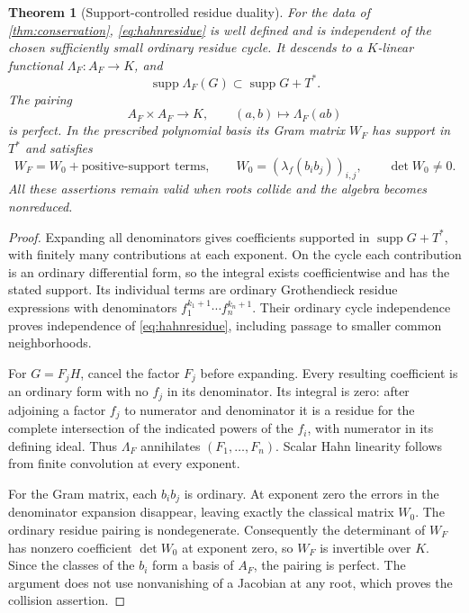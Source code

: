 \documentclass[11pt]{article}
\newtheorem{theorem}{Theorem}[section]
\theoremstyle{definition}
\newcommand{\supp}{\operatorname{supp}}
\begin{document}
\begin{theorem}[Support-controlled residue duality]\label{thm:residueduality}
For the data of \cref{thm:conservation}, \eqref{eq:hahnresidue} is well defined and is independent of the chosen sufficiently small ordinary residue cycle. It descends to a $K$-linear functional $\Lambda_F:A_F\to K$, and
\begin{equation}\label{eq:residuesupport}
 \supp\Lambda_F(G)\subset\supp G+T^*.
\end{equation}
The pairing
\begin{equation}\label{eq:pairing}
 A_F\times A_F\longrightarrow K,\qquad
 (a,b)\longmapsto\Lambda_F(ab)
\end{equation}
is perfect. In the prescribed polynomial basis its Gram matrix $W_F$ has support in $T^*$ and satisfies
\[
 W_F=W_0+\text{positive-support terms},\qquad
 W_0=(\lambda_f(b_ib_j))_{i,j},\qquad\det W_0\ne0.
\]
All these assertions remain valid when roots collide and the algebra becomes nonreduced.
\end{theorem}
\begin{proof}
Expanding all denominators gives coefficients supported in $\supp G+T^*$, with finitely many contributions at each exponent. On the cycle each contribution is an ordinary differential form, so the integral exists coefficientwise and has the stated support. Its individual terms are ordinary Grothendieck residue expressions with denominators $f_1^{k_1+1}\cdots f_n^{k_n+1}$. Their ordinary cycle independence proves independence of \eqref{eq:hahnresidue}, including passage to smaller common neighborhoods.

For $G=F_jH$, cancel the factor $F_j$ before expanding. Every resulting coefficient is an ordinary form with no $f_j$ in its denominator. Its integral is zero: after adjoining a factor $f_j$ to numerator and denominator it is a residue for the complete intersection of the indicated powers of the $f_i$, with numerator in its defining ideal. Thus $\Lambda_F$ annihilates $(F_1,\ldots,F_n)$. Scalar Hahn linearity follows from finite convolution at every exponent.

For the Gram matrix, each $b_ib_j$ is ordinary. At exponent zero the errors in the denominator expansion disappear, leaving exactly the classical matrix $W_0$. The ordinary residue pairing is nondegenerate. Consequently the determinant of $W_F$ has nonzero coefficient $\det W_0$ at exponent zero, so $W_F$ is invertible over $K$. Since the classes of the $b_i$ form a basis of $A_F$, the pairing is perfect. The argument does not use nonvanishing of a Jacobian at any root, which proves the collision assertion.
\end{proof}
\end{document}
